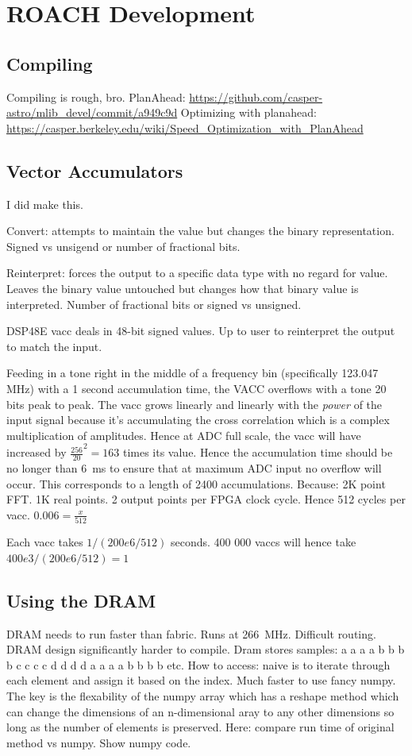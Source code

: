 \chapter{ROACH Development}
\graphicspath{{./img/roach-dev/}}

\section{Compiling}
Compiling is rough, bro.
PlanAhead: \url{https://github.com/casper-astro/mlib_devel/commit/a949c9d}
Optimizing with planahead: \url{https://casper.berkeley.edu/wiki/Speed_Optimization_with_PlanAhead}

\section{Vector Accumulators}
I did make this.

Convert: attempts to maintain the value but changes the binary representation. Signed vs unsigend or number of fractional bits. 

Reinterpret: forces the output to a specific data type with no regard for value. Leaves the binary value untouched but changes how that binary value is interpreted. Number of fractional bits or signed vs unsigned. 

DSP48E vacc deals in 48-bit signed values. Up to user to reinterpret the output to match the input. 

Feeding in a tone right in the middle of a frequency bin (specifically 123.047 MHz) with a 1 second accumulation time, the VACC overflows with a tone 20 bits peak to peak.
The vacc grows linearly and linearly with the \emph{power} of the input signal because it's accumulating the cross correlation which is a complex multiplication of amplitudes. 
Hence at ADC full scale, the vacc will have increased by \(\frac{256}{20}^2 = 163\) times its value.
Hence the accumulation time should be no longer than \SI{6}{\milli\second} to ensure that at maximum ADC input no overflow will occur. This corresponds to a length of 2400 accumulations.
Because: 2K point FFT. 1K real points. 2 output points per FPGA clock cycle. Hence 512 cycles per vacc.
\(0.006 = \frac{x}{512}\) 

Each vacc takes \(1 / (200e6 / 512)\) seconds. 400 000 vaccs will hence take \(400e3 / (200e6 / 512) = 1 \)

\section{Using the DRAM}
DRAM needs to run faster than fabric. Runs at \SI{266}{\mega\hertz}. Difficult routing. DRAM design significantly harder to compile. 
Dram stores samples: a a a a b b b b c c c c d d d d a a a a b b b b etc. 
How to access: naive is to iterate through each element and assign it based on the index.
Much faster to use fancy numpy. The key is the flexability of the numpy array which has a reshape method which can change the dimensions of an n-dimensional aray to any other dimensions so long as the number of elements is preserved. 
Here: compare run time of original method vs numpy. Show numpy code.

